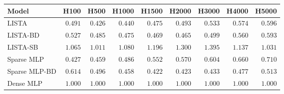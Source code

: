 \begin{tabular}{@{}l r r r r r r r r@{}}
\toprule
Model & H100 & H500 & H1000 & H1500 & H2000 & H3000 & H4000 & H5000 \\
\midrule
LISTA & \(0.491\) & \(0.426\) & \(0.440\) & \(0.475\) & \(0.493\) & \(0.533\) & \(0.574\) & \(0.596\) \\
LISTA-BD & \(0.527\) & \(0.485\) & \(0.475\) & \(0.469\) & \(0.465\) & \(0.499\) & \(0.560\) & \(0.593\) \\
LISTA-SB & \(1.065\) & \(1.011\) & \(1.080\) & \(1.196\) & \(1.300\) & \(1.395\) & \(1.137\) & \(1.031\) \\
Sparse MLP & \(0.427\) & \(0.459\) & \(0.486\) & \(0.552\) & \(0.570\) & \(0.604\) & \(0.660\) & \(0.710\) \\
Sparse MLP-BD & \(0.614\) & \(0.496\) & \(0.458\) & \(0.422\) & \(0.423\) & \(0.433\) & \(0.477\) & \(0.513\) \\
Dense MLP & \(1.000\) & \(1.000\) & \(1.000\) & \(1.000\) & \(1.000\) & \(1.000\) & \(1.000\) & \(1.000\) \\
\bottomrule
\end{tabular}
